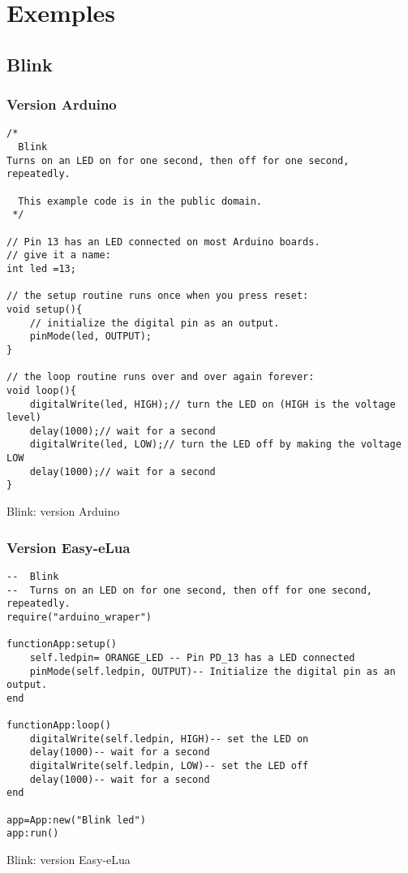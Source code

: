 \chapter[Exemples]{Exemples} 
\label{exemples}
\section{Blink}

\subsection{Version Arduino}

\begin{table}[h]
\begin{lstlisting}
/*
  Blink
Turns on an LED on for one second, then off for one second, repeatedly.

  This example code is in the public domain.
 */

// Pin 13 has an LED connected on most Arduino boards.
// give it a name:
int led =13;

// the setup routine runs once when you press reset:
void setup(){
    // initialize the digital pin as an output.
    pinMode(led, OUTPUT);
}

// the loop routine runs over and over again forever:
void loop(){
    digitalWrite(led, HIGH);// turn the LED on (HIGH is the voltage level)
    delay(1000);// wait for a second
    digitalWrite(led, LOW);// turn the LED off by making the voltage LOW
    delay(1000);// wait for a second
}
\end{lstlisting}
\caption{Blink: version Arduino}
\end{table}

\subsection{Version Easy-eLua}

\begin{table}[h]
\begin{lstlisting}
--  Blink
--  Turns on an LED on for one second, then off for one second, repeatedly.
require("arduino_wraper")

functionApp:setup()
    self.ledpin= ORANGE_LED -- Pin PD_13 has a LED connected
    pinMode(self.ledpin, OUTPUT)-- Initialize the digital pin as an output.
end

functionApp:loop()
    digitalWrite(self.ledpin, HIGH)-- set the LED on
    delay(1000)-- wait for a second
    digitalWrite(self.ledpin, LOW)-- set the LED off
    delay(1000)-- wait for a second
end

app=App:new("Blink led")
app:run()
\end{lstlisting}
\caption{Blink: version Easy-eLua}
\end{table}


